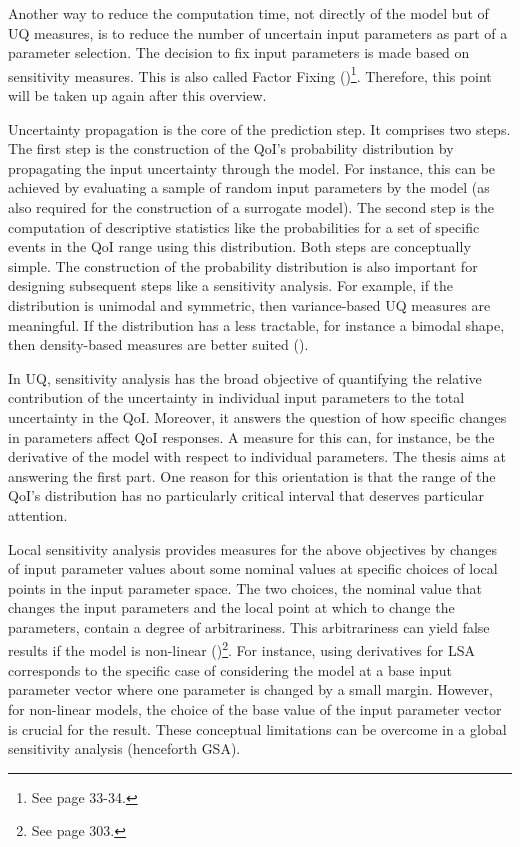 \documentclass[a4paper,12pt]{article}
\begin{document}
Another way to reduce the computation time, not directly of the model but of UQ measures, is to reduce the number of uncertain input parameters as part of a parameter selection. The decision to fix input parameters is made based on sensitivity measures. This is also called Factor Fixing (\cite{Saltelli.2008})\footnote{See page 33-34.}. Therefore, this point will be taken up again after this overview.

Uncertainty propagation is the core of the prediction step. It comprises two steps. The first step is the  construction of the QoI's probability distribution by propagating the input uncertainty through the model. For instance, this can be achieved by evaluating a sample of random input parameters by the model (as also required for the construction of a surrogate model). The second step is the computation of descriptive statistics like the probabilities for a set of specific events in the QoI range using this distribution. Both steps are conceptually simple. The construction of the probability distribution is also important for designing subsequent steps like a sensitivity analysis. For example, if the distribution is unimodal and symmetric, then variance-based UQ measures are meaningful. If the distribution has a less tractable, for instance a bimodal shape, then density-based measures are better suited (\cite{plischke2013global}).

In UQ, sensitivity analysis has the broad objective of quantifying the relative contribution of the uncertainty in individual input parameters to the total uncertainty in the QoI. Moreover, it answers the question of how specific changes in parameters affect QoI responses. A measure for this can, for instance, be the derivative of the model with respect to individual parameters. The thesis aims at answering the first part. One reason for this orientation is that the range of the QoI's distribution has no particularly critical interval that deserves particular attention.

Local sensitivity analysis provides measures for the above objectives by changes of input parameter values about some nominal values at specific choices of local points in the input parameter space. The two choices, the nominal value that changes the input parameters and the local point at which to change the parameters, contain a degree of arbitrariness. This arbitrariness can yield false results if the model is non-linear (\cite{Smith.1961})\footnote{See page 303.}. For instance, using derivatives for LSA corresponds to the specific case of considering the model at a base input parameter vector where one parameter is changed by a small margin. However, for non-linear models, the choice of the base value of the input parameter vector is crucial for the result. These conceptual limitations can be overcome in a global sensitivity analysis (henceforth GSA).\\
\end{document}
